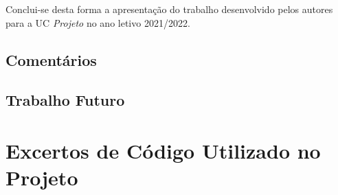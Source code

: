 \documentclass[11pt,a4paper]{report}%
\def\proj{\emph{Projeto}\xspace}
\begin{document}
Conclui-se desta forma a apresentação do trabalho desenvolvido pelos autores
para a UC \proj no ano letivo 2021/2022.

\section{Comentários}

\section{Trabalho Futuro}

\appendix %
\chapter{Excertos de Código Utilizado no Projeto} \label{apndx:samples}
\end{document}
